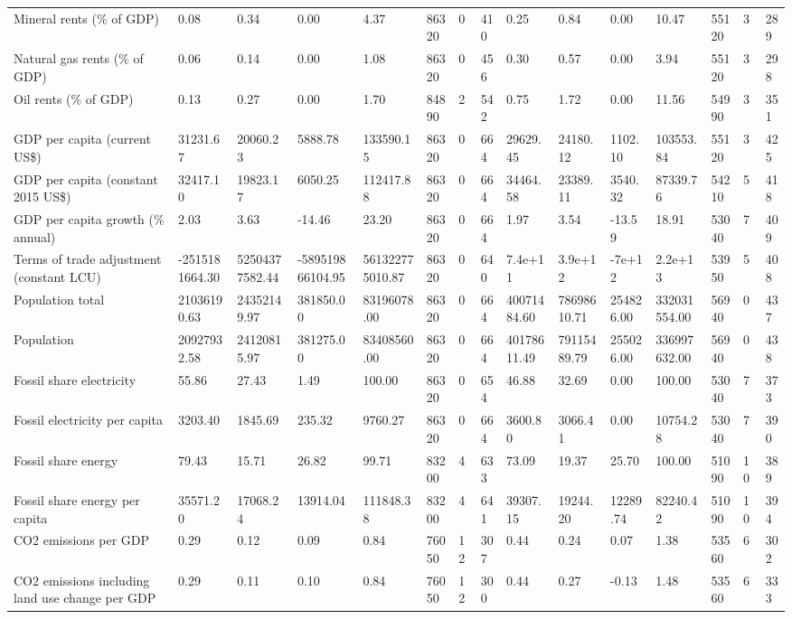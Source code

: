 \begin{longtable}{lllllllllllllll}
\addlinespace
Mineral rents (\% of GDP) & 0.08 & 0.34 & 0.00 & 4.37 & 86320 & 0 & 410 & 0.25 & 0.84 & 0.00 & 10.47 & 55120 & 3 & 289\\
Natural gas rents (\% of GDP) & 0.06 & 0.14 & 0.00 & 1.08 & 86320 & 0 & 456 & 0.30 & 0.57 & 0.00 & 3.94 & 55120 & 3 & 298\\
Oil rents (\% of GDP) & 0.13 & 0.27 & 0.00 & 1.70 & 84890 & 2 & 542 & 0.75 & 1.72 & 0.00 & 11.56 & 54990 & 3 & 351\\
GDP per capita (current US\$) & 31231.67 & 20060.23 & 5888.78 & 133590.15 & 86320 & 0 & 664 & 29629.45 & 24180.12 & 1102.10 & 103553.84 & 55120 & 3 & 425\\
GDP per capita (constant 2015 US\$) & 32417.10 & 19823.17 & 6050.25 & 112417.88 & 86320 & 0 & 664 & 34464.58 & 23389.11 & 3540.32 & 87339.76 & 54210 & 5 & 418\\
\addlinespace
GDP per capita growth (\% annual) & 2.03 & 3.63 & -14.46 & 23.20 & 86320 & 0 & 664 & 1.97 & 3.54 & -13.59 & 18.91 & 53040 & 7 & 409\\
Terms of trade adjustment (constant LCU) & -2515181664.30 & 52504377582.44 & -589519866104.95 & 561322775010.87 & 86320 & 0 & 640 & 7.4e+11 & 3.9e+12 & -7e+12 & 2.2e+13 & 53950 & 5 & 408\\
Population total & 21036190.63 & 24352149.97 & 381850.00 & 83196078.00 & 86320 & 0 & 664 & 40071484.60 & 78698610.71 & 254826.00 & 332031554.00 & 56940 & 0 & 437\\
Population & 20927932.58 & 24120815.97 & 381275.00 & 83408560.00 & 86320 & 0 & 664 & 40178611.49 & 79115489.79 & 255026.00 & 336997632.00 & 56940 & 0 & 438\\
Fossil share electricity & 55.86 & 27.43 & 1.49 & 100.00 & 86320 & 0 & 654 & 46.88 & 32.69 & 0.00 & 100.00 & 53040 & 7 & 373\\
\addlinespace
Fossil electricity per capita & 3203.40 & 1845.69 & 235.32 & 9760.27 & 86320 & 0 & 664 & 3600.80 & 3066.41 & 0.00 & 10754.28 & 53040 & 7 & 390\\
Fossil share energy & 79.43 & 15.71 & 26.82 & 99.71 & 83200 & 4 & 633 & 73.09 & 19.37 & 25.70 & 100.00 & 51090 & 10 & 389\\
Fossil share energy per capita & 35571.20 & 17068.24 & 13914.04 & 111848.38 & 83200 & 4 & 641 & 39307.15 & 19244.20 & 12289.74 & 82240.42 & 51090 & 10 & 394\\
CO2 emissions per GDP & 0.29 & 0.12 & 0.09 & 0.84 & 76050 & 12 & 307 & 0.44 & 0.24 & 0.07 & 1.38 & 53560 & 6 & 302\\
CO2 emissions including land use change per GDP & 0.29 & 0.11 & 0.10 & 0.84 & 76050 & 12 & 300 & 0.44 & 0.27 & -0.13 & 1.48 & 53560 & 6 & 333\\

\end{longtable}
